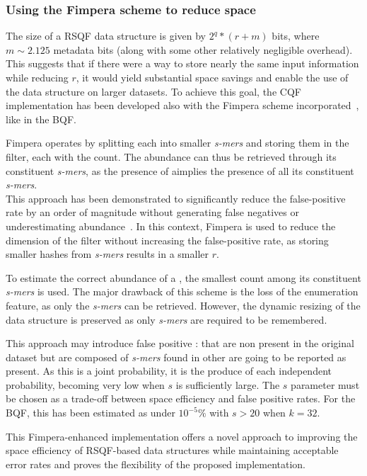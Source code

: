 \subsubsection{Using the Fimpera scheme to reduce space}
The size of a RSQF data structure is given by $2^q * (r + m )$ bits, where $m\sim 2.125$ metadata bits (along with some other relatively negligible overhead). This suggests that if there were a way to store nearly the same input information while reducing $r$, it would yield substantial space savings and enable the use of the data structure on larger datasets. To achieve this goal, the CQF implementation has been developed also with the Fimpera scheme incorporated~\cite{fimpera}, like in the BQF.

Fimpera operates by splitting each \kmer into smaller \emph{s-mers} and storing them in the filter, each with the \kmer count. The \kmer abundance can thus be retrieved through its constituent \emph{s-mers}, as the presence of a\kmer implies the presence of all its constituent \emph{s-mers}.\\
This approach has been demonstrated to significantly reduce the false-positive rate by an order of magnitude without generating false negatives or underestimating \kmer abundance~\cite{fimpera}. In this context, Fimpera is used to reduce the dimension of the filter without increasing the false-positive rate, as storing smaller hashes from \emph{s-mers} results in a smaller $r$.

To estimate the correct abundance of a \kmer, the smallest count among its constituent \emph{s-mers} is used.
The major drawback of this scheme is the loss of the \kmer enumeration feature, as only the \emph{s-mers} can be retrieved. However, the dynamic resizing of the data structure is preserved as only \emph{s-mers} are required to be remembered.

This approach may introduce false positive \kmers: \kmers that are non present in the original dataset but are composed of \emph{s-mers} found in other \kmers are going to be reported as present. As this is a joint probability, it is the produce of each independent probability, becoming very low when $s$ is sufficiently large. The $s$ parameter must be chosen as a trade-off between space efficiency and false positive rates. For the BQF, this has been estimated as under $10^{-5}\%$ with $s > 20$ when $k = 32$.

This Fimpera-enhanced implementation offers a novel approach to improving the space efficiency of RSQF-based data structures while maintaining acceptable error rates and proves the flexibility of the proposed implementation.

